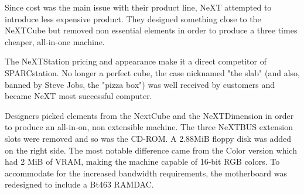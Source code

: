 Since cost was the main issue with their product line, NeXT attempted to introduce less expensive product. They designed something close to the NeXTCube but removed non essential elements in order to produce a three times cheaper, all-in-one machine.\\
\par
The NeXTStation pricing and appearance make it a direct competitor of SPARCstation. No longer a perfect cube, the case nicknamed "the slab" (and also, banned by Steve Jobs, the "pizza box") was well received by customers and became NeXT most successful computer.\\
\par 
{}
\par
\vspace{-10pt}
Designers picked elements from the NextCube and the NeXTDimension in order to produce an all-in-on, non extensible machine. The three NeXTBUS extension slots were removed and so was the CD-ROM. A 2.88MiB floppy disk was added on the right side. The most notable difference came from the Color version which had 2 MiB of VRAM, making the machine capable of 16-bit RGB colors. To accommodate for the increased bandwidth requirements, the motherboard was redesigned to include a Bt463 RAMDAC.\\
\par


